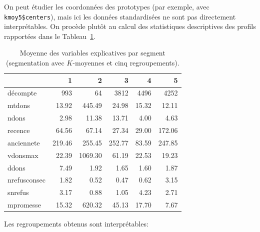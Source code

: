 \documentclass[
  11pt,
  letterpaper,
]{scrbook}
\newenvironment{Shaded}{\begin{snugshade}}{\end{snugshade}}
\newcommand{\AttributeTok}[1]{\textcolor[rgb]{0.40,0.45,0.13}{#1}}
\newcommand{\FunctionTok}[1]{\textcolor[rgb]{0.28,0.35,0.67}{#1}}
\newcommand{\NormalTok}[1]{\textcolor[rgb]{0.00,0.23,0.31}{#1}}
\newcommand{\SpecialCharTok}[1]{\textcolor[rgb]{0.37,0.37,0.37}{#1}}
\theoremstyle{definition}
\theoremstyle{remark}
\begin{document}
On peut étudier les coordonnées des prototypes (par exemple, avec
\texttt{kmoy5\$centers}), mais ici les données standardisées ne sont pas
directement interprétables. On procède plutôt au calcul des statistiques
descriptives des profils rapportées dans le
Tableau~\ref{tbl-kmoy5resume}.

\begin{Shaded}
\end{Shaded}

\hypertarget{tbl-kmoy5resume}{}
\begin{table}
\caption{\label{tbl-kmoy5resume}Moyenne des variables explicatives par segment (segmentation avec
\(K\)-moyennes et cinq regroupements). }\tabularnewline

\centering
\begin{tabular}{lrrrrr}
\toprule
  & 1 & 2 & 3 & 4 & 5\\
\midrule
décompte & 993 & 64 & 3812 & 4496 & 4252\\
mtdons & 13.92 & 445.49 & 24.98 & 15.32 & 12.11\\
ndons & 2.98 & 11.38 & 13.71 & 4.00 & 4.63\\
recence & 64.56 & 67.14 & 27.34 & 29.00 & 172.06\\
anciennete & 219.46 & 255.45 & 252.77 & 83.59 & 247.85\\
\addlinespace
vdonsmax & 22.39 & 1069.30 & 61.19 & 22.53 & 19.23\\
ddons & 7.49 & 1.92 & 1.65 & 1.60 & 1.87\\
nrefusconsec & 1.82 & 0.52 & 0.47 & 0.62 & 3.15\\
snrefus & 3.17 & 0.88 & 1.05 & 4.23 & 2.71\\
mpromesse & 15.32 & 620.32 & 45.13 & 17.70 & 7.67\\
\bottomrule
\end{tabular}
\end{table}

Les regroupements obtenus sont interprétables:
\end{document}
